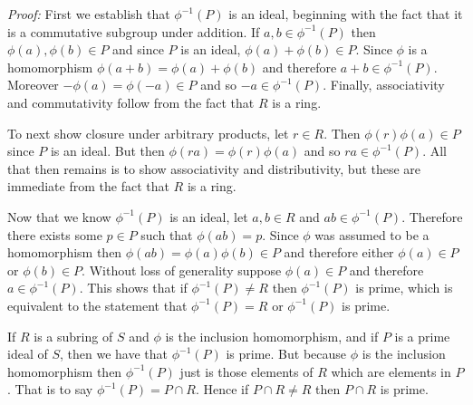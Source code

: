 \documentclass[11pt]{article}
\begin{document}
\begin{enumerate}
{\it Proof:} First we establish that $\phi^{-1}(P)$ is an ideal, beginning with the fact that it is a commutative subgroup under addition.  If $a,b\in \phi^{-1}(P)$ then $\phi(a),\phi(b)\in P$ and since $P$ is an ideal, $\phi(a)+\phi(b)\in P$.  Since $\phi$ is a homomorphism $\phi(a+b)=\phi(a)+\phi(b)$ and therefore $a+b\in \phi^{-1}(P)$.  Moreover $-\phi(a)=\phi(-a)\in P$ and so $-a\in \phi^{-1}(P)$.  Finally, associativity and commutativity follow from the fact that $R$ is a ring.

To next show closure under arbitrary products, let $r\in R$.  Then $\phi(r)\phi(a)\in P$ since $P$ is an ideal.  But then $\phi(ra)=\phi(r)\phi(a)$ and so $ra\in\phi^{-1}(P)$.  All that then remains is to show associativity and distributivity, but these are immediate from the fact that $R$ is a ring.

Now that we know $\phi^{-1}(P)$ is an ideal, let $a,b\in R$ and $ab\in \phi^{-1}(P)$.  Therefore there exists some $p\in P$ such that $\phi(ab)=p$.  Since $\phi$ was assumed to be a homomorphism then $\phi(ab)=\phi(a)\phi(b)\in P$ and therefore either $\phi(a)\in P$ or $\phi(b)\in P$.  Without loss of generality suppose $\phi(a)\in P$ and therefore $a\in\phi^{-1}(P)$.  This shows that if $\phi^{-1}(P)\ne R$ then $\phi^{-1}(P)$ is prime, which is equivalent to the statement that $\phi^{-1}(P)=R$ or $\phi^{-1}(P)$ is prime.

If $R$ is a subring of $S$ and $\phi$ is the inclusion homomorphism, and if $P$ is a prime ideal of $S$, then we have that $\phi^{-1}(P)$ is prime.  But because $\phi$ is the inclusion homomorphism then $\phi^{-1}(P)$ just is those elements of $R$ which are elements in $P$.  That is to say $\phi^{-1}(P)=P\cap R$.  Hence if $P\cap R\ne R$ then $P\cap R$ is prime.

\end{enumerate}
\end{document}
